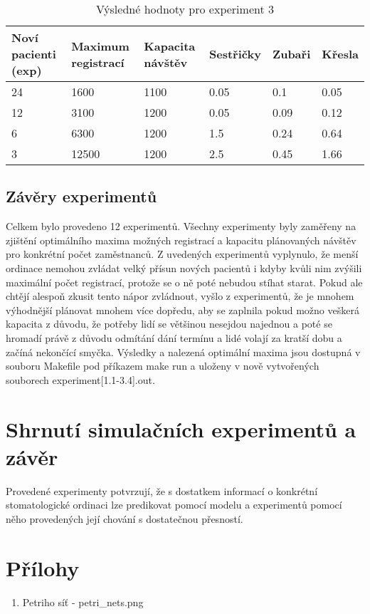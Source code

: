\documentclass[a4paper,11pt,titlepage]{article}
\begin{document}
\begin{table}[h!]
\centering
\begin{tabular}{|l|l|l|l|l|l|}
\hline
Noví pacienti (exp) & Maximum registrací &  Kapacita návštěv & Sestřičky & Zubaři & Křesla \\ \hline
24       & 1600                	& 1100  & 0.05 & 0.1 & 0.05       	 \\ \hline
12       & 3100        		& 1200  & 0.05 & 0.09 & 0.12           	 \\ \hline
6        & 6300			& 1200  & 1.5 & 0.24 & 0.64    	 	 \\ \hline
3        & 12500		& 1200  & 2.5 & 0.45 & 1.66       	 \\ \hline
\end{tabular}
\caption {Výsledné hodnoty pro experiment 3} \label{tab:title} 
\end{table}

\subsection{Závěry experimentů}

Celkem bylo provedeno 12 experimentů. Všechny experimenty byly zaměřeny na zjištění optimálního maxima možných registrací a kapacitu plánovaných návštěv pro konkrétní počet zaměstnanců. Z uvedených experimentů vyplynulo, že menší ordinace nemohou zvládat velký přísun nových pacientů i kdyby kvůli nim zvýšili maximální počet registrací, protože se o ně poté nebudou stíhat starat. Pokud ale chtějí alespoň zkusit tento nápor zvládnout, vyšlo z experimentů, že je mnohem výhodnější plánovat mnohem více dopředu, aby se zaplnila pokud možno veškerá kapacita z důvodu, že potřeby lidí se většinou nesejdou najednou a poté se hromadí právě z důvodu odmítání dání termínu a lidé volají za kratší dobu a začíná nekončící smyčka.
\newline
Výsledky a nalezená optimální maxima jsou dostupná v souboru Makefile pod příkazem make run a uloženy v nově vytvořených souborech experiment[1.1-3.4].out.

\section{Shrnutí simulačních experimentů a závěr}

Provedené experimenty potvrzují, že s dostatkem informací o konkrétní stomatologické ordinaci lze predikovat pomocí modelu a experimentů pomocí něho provedených její chování s dostatečnou přesností.

\section{Přílohy}

\begin{enumerate}
\item Petriho síť - petri\_nets.png
\end{enumerate}

\newpage

\nocite{*}




\newpage
\thispagestyle{empty}
\end{document}
